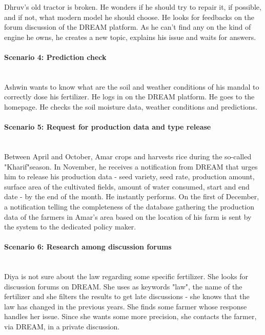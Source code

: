 Dhruv's old tractor is broken. He wonders if he should try to repair it, if possible, and if not, what modern model he should choose. He looks for feedbacks on the forum discussion of the DREAM platform. As he can't find any on the kind of engine he owns, he creates a new topic, explains his issue and waits for answers.

\paragraph{Scenario 4: Prediction check}\mbox{} \\

Ashwin wants to know what are the soil and weather conditions of his mandal to correctly dose his fertilizer. He logs in on the DREAM platform. He goes to the homepage. He checks the soil moisture data, weather conditions and predictions.

\paragraph{Scenario 5: Request for production data and type release}\mbox{} \\

Between April and October, Amar crops and harvests rice during the so-called "Kharif"season. In November, he receives a notification from DREAM that urges him to release his production data - seed variety, seed rate, production amount, surface area of the cultivated fields, amount of water consumed, start and end date - by the end of the month. He instantly performs. On the first of December, a notification telling the completeness of the database gathering the production data of the farmers in Amar's area based on the location of his farm is sent by the system to the dedicated policy maker.

\paragraph{Scenario 6: Research among discussion forums}\mbox{} \\

Diya is not sure about the law regarding some specific fertilizer. She looks for discussion forums on DREAM. She uses as keywords "law", the name of the fertilizer and she filters the results to get late discussions - she knows that the law has changed in the previous years. She finds some farmer whose response handles her issue. Since she wants some more precision, she contacts the farmer, via DREAM, in a private discussion.

